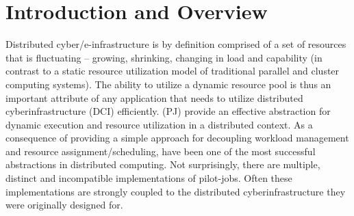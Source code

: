 \documentclass{sig-alternate}
\begin{document}
\section{Introduction and Overview} 

Distributed cyber/e-infrastructure is by definition comprised of a set
of resources that is fluctuating -- growing, shrinking, changing in
load and capability (in contrast to a static resource utilization
model of traditional parallel and cluster computing systems).  The
ability to utilize a dynamic resource pool is thus an important
attribute of any application that needs to utilize distributed
cyberinfrastructure (DCI) efficiently. \pilotjobs (PJ) provide an
effective abstraction for dynamic execution and resource utilization
in a distributed context. As a consequence of providing a simple
approach for decoupling workload management and resource
assignment/scheduling, \pilotjobs have been one of the most successful
abstractions in distributed computing.  Not surprisingly, there are
multiple, distinct and incompatible implementations of
pilot-jobs. Often these implementations are strongly coupled to the
distributed cyberinfrastructure they were originally designed for.


\end{document}
